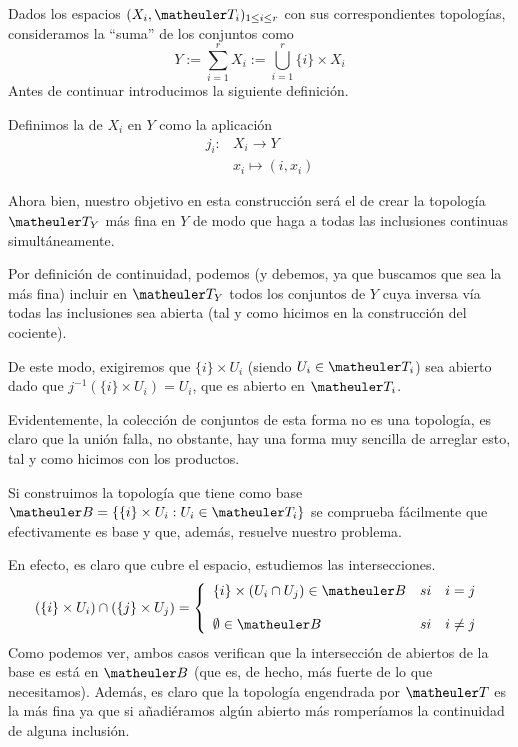 Dados los espacios $(X_i, \T_i)_{1\le i \le r}$ con sus correspondientes topologías, consideramos la ``suma'' de los conjuntos como
\begin{equation}
 Y:=\sum_{i=1}^rX_i:=\bigcup_{i=1}^r\{i\}\times X_i
\end{equation}
Antes de continuar introducimos la siguiente definición.
\begin{defi}[Inclusiones]
	Definimos la  de $X_i$ en $Y$ como la aplicación
	\begin{equation}
		\begin{array}{cc}
		j_i: & X_i\to Y\\
		& x_i\mapsto (i,x_i)
		\end{array}
	\end{equation}
\end{defi}
Ahora bien, nuestro objetivo en esta construcción será el de crear la topología $\T_Y$ más fina en $Y$ de modo que haga a todas las inclusiones continuas simultáneamente.

Por definición de continuidad, podemos (y debemos, ya que buscamos que sea la más fina) incluir en $\T_Y$ todos los conjuntos de $Y$ cuya inversa vía todas las inclusiones sea abierta (tal y como hicimos en la construcción del cociente).

De este modo, exigiremos que $\{i\}\times U_i$ (siendo $U_i\in\T_i$) sea abierto dado que $j^{-1}(\{i\}\times U_i)=U_i$, que es abierto en $\T_i$.

Evidentemente, la colección de conjuntos de esta forma no es una topología, es claro que la unión falla, no obstante, hay una forma muy sencilla de arreglar esto, tal y como hicimos con los productos.

Si construimos la topología que tiene como base $\B=\{\{i\}\times U_i:U_i\in\T_i\}$ se comprueba fácilmente que efectivamente es base y que, además, resuelve nuestro problema.

En efecto, es claro que cubre el espacio, estudiemos las intersecciones.
\begin{equation}
(\{i\}\times U_i)\cap(\{j\}\times U_j)=
\left\{ \begin{array}{lcc}
\{i\}\times(U_i\cap U_j)\in\B &   si  & i=j \\
\\  \emptyset\in\B& si & i\neq j 
\end{array}
\right.
\end{equation}
Como podemos ver, ambos casos verifican que la intersección de abiertos de la base es está en $\B$ (que es, de hecho, más fuerte de lo que necesitamos). Además, es claro que la topología engendrada por $\T$ es la más fina ya que si añadiéramos algún abierto más romperíamos la continuidad de alguna inclusión.

